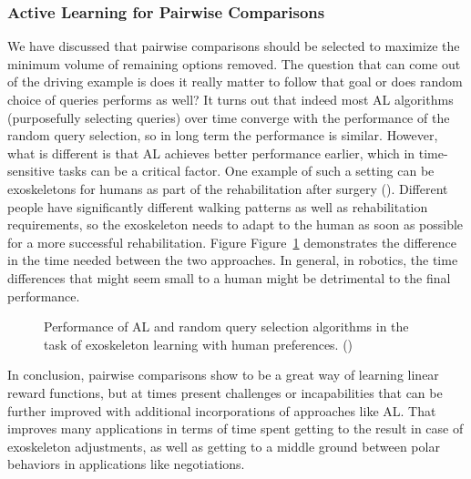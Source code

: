 \documentclass[
  letterpaper,
  numbers=noenddot,
  DIV=11]{scrreprt}
\theoremstyle{plain}
\theoremstyle{definition}
\theoremstyle{remark}
\begin{document}
\subsubsection{Active Learning for Pairwise
Comparisons}\label{active-learning-for-pairwise-comparisons}

We have discussed that pairwise comparisons should be selected to
maximize the minimum volume of remaining options removed. The question
that can come out of the driving example is does it really matter to
follow that goal or does random choice of queries performs as well? It
turns out that indeed most AL algorithms (purposefully selecting
queries) over time converge with the performance of the random query
selection, so in long term the performance is similar. However, what is
different is that AL achieves better performance earlier, which in
time-sensitive tasks can be a critical factor. One example of such a
setting can be exoskeletons for humans as part of the rehabilitation
after surgery (). Different people
have significantly different walking patterns as well as rehabilitation
requirements, so the exoskeleton needs to adapt to the human as soon as
possible for a more successful rehabilitation. Figure
Figure~\ref{fig-robotics} demonstrates the difference in the time needed
between the two approaches. In general, in robotics, the time
differences that might seem small to a human might be detrimental to the
final performance.

\begin{figure}


\caption{\label{fig-robotics}Performance of AL and random query
selection algorithms in the task of exoskeleton learning with human
preferences. ()}

\end{figure}%

In conclusion, pairwise comparisons show to be a great way of learning
linear reward functions, but at times present challenges or
incapabilities that can be further improved with additional
incorporations of approaches like AL. That improves many applications in
terms of time spent getting to the result in case of exoskeleton
adjustments, as well as getting to a middle ground between polar
behaviors in applications like negotiations.
\end{document}
